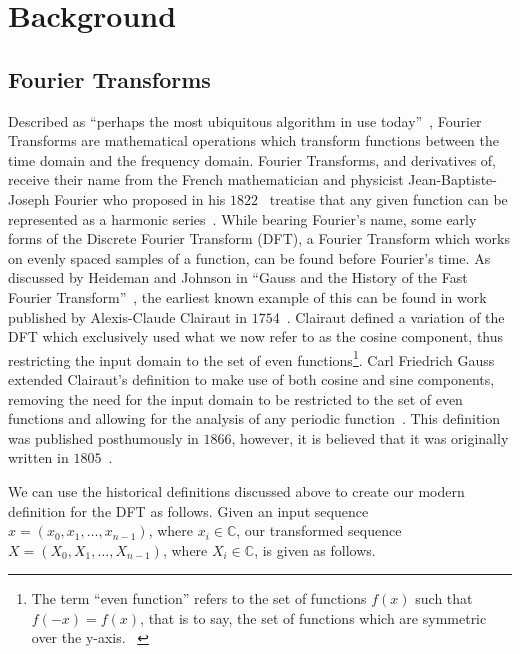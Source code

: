 \section{Background}
\subsection{Fourier Transforms}
Described as ``perhaps the most ubiquitous algorithm in use today''~\cite{Top10Algos},
Fourier Transforms are mathematical operations which transform functions between 
the time domain and the frequency domain.
Fourier Transforms, and derivatives of, receive their name from the French 
mathematician and physicist Jean-Baptiste-Joseph Fourier who proposed in his 
$1822$~\cite{Fourier1822} treatise that any given function can be represented as 
a harmonic series~\cite{Saribulut2013}.
While bearing Fourier's name, some early forms of the Discrete Fourier 
Transform (DFT), a Fourier Transform which works on evenly spaced samples of a 
function, can be found before Fourier's time.
As discussed by Heideman and Johnson in ``Gauss and the History of the Fast 
Fourier Transform''~\cite{Heideman1985}, the earliest known example of this can 
be found in work published by Alexis-Claude Clairaut in $1754$~\cite{Clairaut1754}.
Clairaut defined a variation of the DFT which exclusively used what we now refer 
to as the cosine component, thus restricting the input domain to the set of 
even functions\footnote{The term ``even function'' refers to the set of 
functions $f(x)$ such that $f(-x)=f(x)$, that is to say, the set of functions 
which are symmetric over the y-axis.  ~\cite{Gelfand1990}\cite{Tolstov1962}}\cite{Heideman1985}.
Carl Friedrich Gauss extended Clairaut's definition to make use of both cosine 
and sine components, removing the need for the input domain to be restricted 
to the set of even functions and allowing for the analysis of any periodic 
function~\cite{Gauss1866}\cite{Heideman1985}.
This definition was published posthumously in $1866$, however, it is believed 
that it was originally written in $1805$~\cite{Heideman1985}.

We can use the historical definitions discussed above to create our modern 
definition for the DFT as follows.
Given an input sequence $x = 
        (x_0,x_1,\dots,x_{n-1})$,
            where $x_i\in\mathbb{C}
            $,
our transformed sequence $X =
        (X_0,X_1,\dots,X_{n-1})$,
            where $X_i\in\mathbb{C}
            $,
is given as follows.

